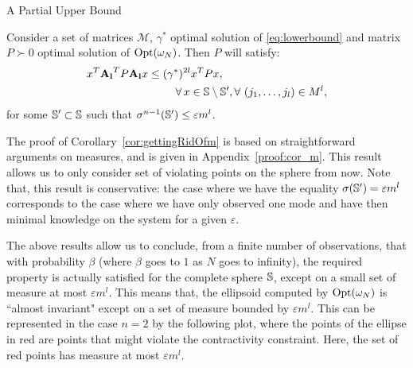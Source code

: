 \begin{subsection}{A Partial Upper Bound}
\begin{cor}\label{cor:gettingRidOfm}
Consider a set of matrices $\mathcal{M}$, $\gamma^{*}$ optimal solution of \eqref{eq:lowerbound} and matrix $P \succ 0$ optimal solution of $\text{Opt}(\omega_N)$. Then $P$ will satisfy:
\begin{equation}\label{eqn:P0}
\begin{aligned}
&x^T \mathbf{A_l}^T P\mathbf{A_l} x\leq (\gamma^{*})^{2l} x^T P x, \\
& \qquad \qquad \qquad \qquad \forall\, x \in \mathbb{S} \setminus \mathbb{S}', \forall\ (j_1, \dots, j_l) \in M^l,
\end{aligned}
\end{equation}
for some $\mathbb{S}' \subset \mathbb{S}$ such that $\sigma^{n-1}(\mathbb{S}') \leq \varepsilon m^l $.
\end{cor}

The proof of Corollary~\ref{cor:gettingRidOfm} is based on straightforward arguments on measures, and is given in Appendix~\ref{proof:cor_m}. This result allows us to only consider set of violating points on the sphere from now. Note that, this result is conservative: the case where we have the equality $\sigma(\mathbb{S}') = \varepsilon m^l$ corresponds to the case where we have only observed one mode  and have then minimal knowledge on the system for a given $\varepsilon$.


The above results allow us to conclude, from a finite number of observations, that with probability $\beta$ (where $\beta$ goes to $1$ as $N$ goes to infinity), the required property is actually satisfied for the complete sphere $\mathbb{S}$, except on a small set of measure at most $\varepsilon m^l$. This means that, the ellipsoid computed by $\text{Opt}(\omega_N)$ is ``almost invariant"  except on a set of measure bounded by $\varepsilon m^l$. This can be represented in the case $n=2$ by the following plot, where the points of the ellipse in red are points that might violate the contractivity constraint. Here, the set of red points has measure at most $\varepsilon m^l$.

\begin{figure}[H]\label{fig:ellipsoid}
\begin{center}
\end{center}
\end{figure}
\end{subsection}
